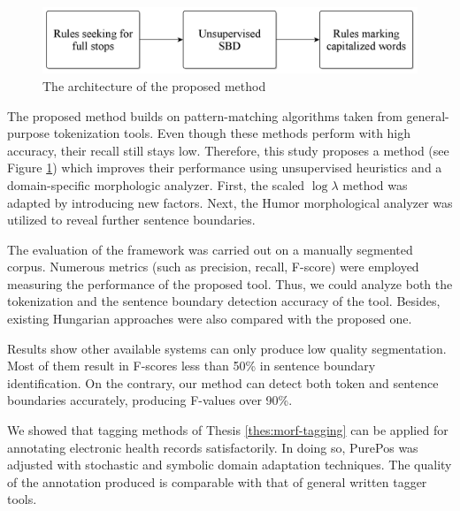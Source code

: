 \begin{figure}[H]
  \centering
  \includegraphics[scale=0.2]{Clinical/clin_segm_arch.png} 
  \caption{The architecture of the proposed method}
  \label{fig:clin-segment-arch_en}
\end{figure}

The proposed method builds on pattern-matching algorithms taken from general-purpose tokenization tools.
Even though these methods perform with high accuracy, their recall still stays low.
Therefore, this study proposes a method (see Figure \ref{fig:clin-segment-arch_en}) which improves their performance using unsupervised heuristics and a domain-specific morphologic analyzer.
First, the scaled $\log\lambda$  method \cite{kiss2006unsupervised} was adapted by introducing new factors.
Next, the Humor morphological analyzer was utilized to reveal further sentence boundaries.

The evaluation of the framework was carried out on a manually segmented corpus. 
Numerous metrics (such as precision, recall, F-score) were employed measuring the performance of the proposed tool.
Thus, we could analyze both the tokenization and the sentence boundary detection accuracy of the tool.
Besides, existing Hungarian approaches were also compared with the proposed one.

Results show other available systems can only produce low quality segmentation.
Most of them result in F-scores less than 50\% in sentence boundary identification.
On the contrary, our method can detect both token and sentence boundaries accurately, producing F-values over 90\%.


\thesisline%

\begin{core}
\begin{thesis}%
\label{thes:clin-pos}
We showed that tagging methods of Thesis \ref{thes:morf-tagging} can be applied for annotating electronic health records satisfactorily.
In doing so, PurePos was adjusted with stochastic and symbolic domain adaptation techniques.
The quality of the annotation produced is comparable with that of general written tagger tools.
\end{thesis}

\begin{pub}
\cite{Orosz2013,Orosz2014b,Orosz2014x} 
\end{pub}
\end{core}

